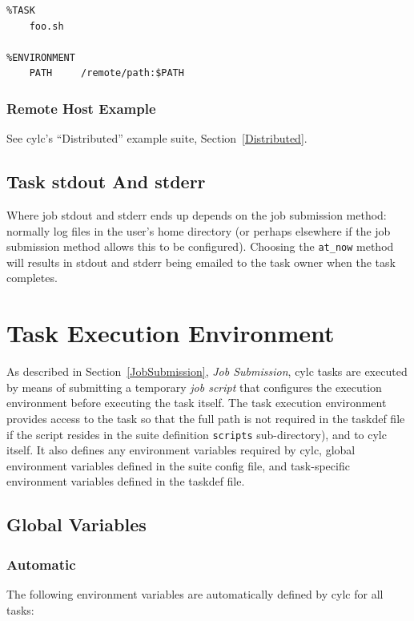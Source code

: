 \documentclass[11pt,a4paper]{article}
\begin{document}
\begin{lstlisting}
%TASK
    foo.sh

%ENVIRONMENT
    PATH     /remote/path:$PATH
\end{lstlisting}

\subsubsection{Remote Host Example}

See cylc's ``Distributed'' example suite, Section~\ref{Distributed}.


\subsection{Task stdout And stderr}
\label{TaskstdoutAndstderr}

Where job stdout and stderr ends up depends on the job submission
method: normally log files in the user's home directory (or perhaps
elsewhere if the job submission method allows this to be configured).
Choosing the \lstinline=at_now= method will results in stdout and
stderr being emailed to the task owner when the task completes.

\pagebreak
\section{Task Execution Environment}
\label{TaskExecutionEnvironment}

As described in Section~\ref{JobSubmission}, {\em Job Submission}, cylc
tasks are executed by means of submitting a temporary {\em job script}
that configures the execution environment before
executing the task itself. The task execution environment provides
access to the task so that the full path is not required in the
taskdef file if the script resides in the suite definition
\lstinline=scripts= sub-directory), and to cylc itself. It also
defines any environment variables required by cylc, global
environment variables defined in the suite config file, and 
task-specific environment variables defined in the taskdef file.

\subsection{Global Variables}
\lstset{language=bash}

\subsubsection{Automatic}
The following environment variables are automatically defined by cylc
for all tasks:
\end{document}
